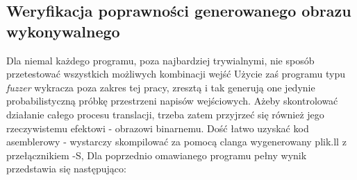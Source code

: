 \subsection{Weryfikacja poprawności generowanego obrazu wykonywalnego}
Dla niemal każdego programu, poza najbardziej trywialnymi, nie sposób przetestować wszystkich możliwych kombinacji wejść Użycie zaś programu typu \textit{fuzzer} wykracza poza zakres tej pracy, zresztą i tak generują one jedynie probabilistyczną próbkę przestrzeni napisów wejściowych. Ażeby skontrolować działanie całego procesu translacji, trzeba zatem przyjrzeć się również jego rzeczywistemu efektowi - obrazowi binarnemu. Dość łatwo uzyskać kod asemblerowy - wystarczy skompilować za pomocą clanga wygenerowany plik.ll z przełącznikiem -S, Dla poprzednio omawianego programu pełny wynik przedstawia się następująco:

